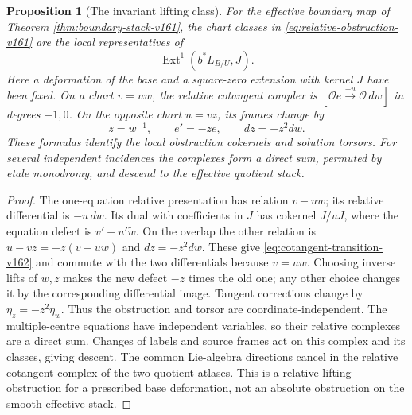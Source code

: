 \documentclass[11pt,reqno]{amsart}
\numberwithin{equation}{section}
\newtheorem{proposition}[theorem]{Proposition}
\theoremstyle{definition}\newtheorem{definition}[theorem]{Definition}
\theoremstyle{remark}\newtheorem{remark}[theorem]{Remark}
\newcommand{\OO}{\mathcal O}\newcommand{\II}{\mathcal I}
\begin{document}
\begin{proposition}[The invariant lifting class]
\label{prop:invariant-lifting-v162}
For the effective boundary map of Theorem
\ref{thm:boundary-stack-v161}, the chart classes in
\eqref{eq:relative-obstruction-v161} are the local representatives of
\[
           \operatorname{Ext}^1(b^*L_{B/U},J).
\]
Here a deformation of the base and a square-zero extension with
kernel $J$ have been fixed. On a chart $v=uw$, the relative cotangent
complex is $[\OO e\xrightarrow{-u}\OO\,dw]$ in degrees $-1,0$.
On the opposite chart $u=vz$, its frames change by
\begin{equation}\label{eq:cotangent-transition-v162}
           z=w^{-1},\qquad e'=-z e,\qquad dz=-z^2dw.
\end{equation}
These formulas identify the local obstruction cokernels and solution
torsors. For several independent incidences the complexes form a
direct sum, permuted by etale monodromy, and descend to the effective
quotient stack.
\end{proposition}
\begin{proof}
The one-equation relative presentation has relation $v-uw$; its
relative differential is $-u\,dw$. Its dual with coefficients in
$J$ has cokernel $J/uJ$, where the equation defect is
$v'-u'\widetilde w$. On the overlap the other relation is
$u-vz=-z(v-uw)$ and $dz=-z^2dw$. These give
\eqref{eq:cotangent-transition-v162} and commute with the two
differentials because $v=uw$. Choosing inverse lifts of $w,z$ makes
the new defect $-z$ times the old one; any other choice changes it
by the corresponding differential image. Tangent corrections change
by $\eta_z=-z^2\eta_w$. Thus the obstruction and torsor are
coordinate-independent. The multiple-centre equations have independent
variables, so their relative complexes are a direct sum. Changes of
labels and source frames act on this complex and its classes, giving
descent. The common Lie-algebra directions cancel in the relative
cotangent complex of the two quotient atlases. This is a relative
lifting obstruction for a prescribed base deformation, not an
absolute obstruction on the smooth effective stack.
\end{proof}
\end{document}
